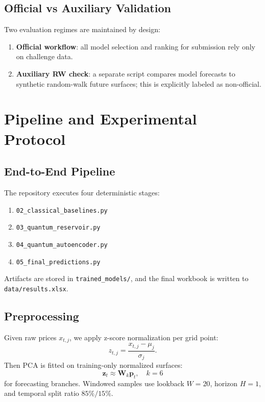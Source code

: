 \documentclass[11pt]{article}
\begin{document}
\subsection{Official vs Auxiliary Validation}
Two evaluation regimes are maintained by design:
\begin{enumerate}[leftmargin=1.4em]
  \item \textbf{Official workflow}: all model selection and ranking for submission rely only on challenge data.
  \item \textbf{Auxiliary RW check}: a separate script compares model forecasts to synthetic random-walk future surfaces; this is explicitly labeled as non-official.
\end{enumerate}

\section{Pipeline and Experimental Protocol}
\subsection{End-to-End Pipeline}
The repository executes four deterministic stages:
\begin{enumerate}[leftmargin=1.4em]
  \item \texttt{02\_classical\_baselines.py}
  \item \texttt{03\_quantum\_reservoir.py}
  \item \texttt{04\_quantum\_autoencoder.py}
  \item \texttt{05\_final\_predictions.py}
\end{enumerate}
Artifacts are stored in \texttt{trained\_models/}, and the final workbook is written to \texttt{data/results.xlsx}.

\subsection{Preprocessing}
Given raw prices \(x_{t,j}\), we apply z-score normalization per grid point:
\begin{equation}
z_{t,j}=\frac{x_{t,j}-\mu_j}{\sigma_j}.
\end{equation}
Then PCA is fitted on training-only normalized surfaces:
\begin{equation}
\mathbf{z}_t \approx \mathbf{W}_k \mathbf{p}_t,\quad k=6
\end{equation}
for forecasting branches. Windowed samples use lookback \(W=20\), horizon \(H=1\), and temporal split ratio \(85\%/15\%.\)
\end{document}
